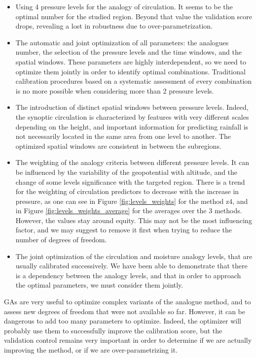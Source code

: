 \documentclass[twocol]{ametsoc}
\begin{document}
\begin{itemize}
	\item Using 4 pressure levels for the analogy of circulation. It seems to be the optimal number for the studied region. Beyond that value the validation score drops, revealing a lost in robustness due to over-parametrization.
	\item The automatic and joint optimization of all parameters: the analogues number, the selection of the pressure levels and the time windows, and the spatial windows. These parameters are highly interdependent, so we need to optimize them jointly in order to identify optimal combinations. Traditional calibration procedures based on a systematic assessment of every combination is no more possible when considering more than 2 pressure levels.
	\item The introduction of distinct spatial windows between pressure levels. Indeed, the synoptic circulation is characterized by features with very different scales depending on the height, and important information for predicting rainfall is not necessarily located in the same area from one level to another. The optimized spatial windows are consistent in between the subregions.
	\item The weighting of the analogy criteria between different pressure levels. It can be influenced by the variability of the geopotential with altitude, and the change of some levels significance with the targeted region. There is a trend for the weighting of circulation predictors to decrease with the increase in pressure, as one can see in Figure \ref{fig:levels_weights} for the method z4, and in Figure \ref{fig:levels_weights_average} for the averages over the 3 methods. However, the values stay around equity. This may not be the most influencing factor, and we may suggest to remove it first when trying to reduce the number of degrees of freedom.
	\item The joint optimization of the circulation and moisture analogy levels, that are usually calibrated successively. We have been able to demonstrate that there is a dependency between the analogy levels, and that in order to approach the optimal parameters, we must consider them jointly.
\end{itemize}
	
GAs are very useful to optimize complex variants of the analogue method, and to assess new degrees of freedom that were not available so far. However, it can be dangerous to add too many parameters to optimize. Indeed, the optimizer will probably use them to successfully improve the calibration score, but the validation control remains very important in order to determine if we are actually improving the method, or if we are over-parametrizing it.
\end{document}
